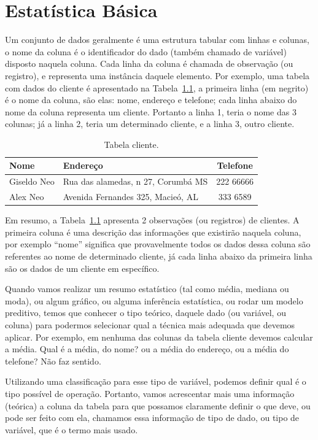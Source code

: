 \documentclass[a4paper,12pt]{book}
\begin{document}
\chapter{Estatística Básica}

Um conjunto de dados geralmente é uma estrutura tabular com linhas e colunas, o nome da coluna é o identificador do dado (também chamado de variável) disposto naquela coluna. Cada linha da coluna é chamada de observação (ou registro), e representa uma instância daquele elemento. Por exemplo, uma tabela com dados do cliente é apresentado na Tabela~\ref{tbl:cliente}, a primeira linha (em negrito) é o nome da coluna, são elas: nome, endereço e telefone; cada linha abaixo do nome da coluna representa um cliente. Portanto a linha 1, teria o nome das 3 colunas; já a linha 2, teria um determinado cliente, e a linha 3, outro cliente.

\begin{table}
	\centering
	\caption{Tabela cliente.}
	\begin{tabular}{|l|l|c|}
	\hline
	\textbf{Nome} & \textbf{Endereço} & \textbf{Telefone} \\
	\hline
	Giseldo Neo & Rua das alamedas, n 27, Corumbá MS & 222 66666 \\
	\hline
	Alex Neo & Avenida Fernandes 325, Macieó, AL& 333 6589 \\
	\hline
	\end{tabular}
	\label{tbl:cliente}
\end{table}

Em resumo, a Tabela~\ref{tbl:cliente} apresenta 2 observações (ou registros) de clientes. A primeira coluna é uma descrição das informações que existirão naquela coluna, por exemplo ``nome'' significa que provavelmente todos os dados dessa coluna são referentes ao nome de determinado cliente, já cada linha abaixo da primeira linha são os dados de um cliente em específico.

Quando vamos realizar um resumo estatístico (tal como média, mediana ou moda), ou algum gráfico, ou alguma inferência estatística, ou rodar um modelo preditivo, temos que conhecer o tipo teórico, daquele dado (ou variável, ou coluna) para podermos selecionar qual a técnica mais adequada que devemos aplicar. Por exemplo, em nenhuma das colunas da tabela cliente devemos calcular a média. Qual é a média, do nome? ou a média do endereço, ou a média do telefone? Não faz sentido.

Utilizando uma classificação para esse tipo de variável, podemos definir qual é o tipo possível de operação. Portanto, vamos acrescentar mais uma informação (teórica) a coluna da tabela para que possamos claramente definir o que deve, ou pode ser feito com ela, chamamos essa informação de tipo de dado, ou tipo de variável, que é o termo mais usado.
\end{document}
